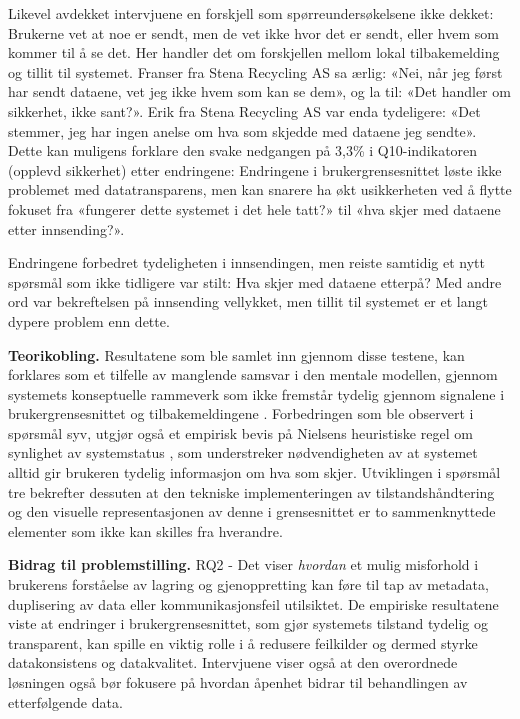 Likevel avdekket intervjuene en forskjell som spørreundersøkelsene ikke dekket: Brukerne vet at noe er sendt, men de vet ikke hvor det er sendt, eller hvem som kommer til å se det. Her handler det om forskjellen mellom lokal tilbakemelding og tillit til systemet. Franser fra Stena Recycling AS sa ærlig: «Nei, når jeg først har sendt dataene, vet jeg ikke hvem som kan se dem», og la til: «Det handler om sikkerhet, ikke sant?». Erik fra Stena Recycling AS var enda tydeligere: «Det stemmer, jeg har ingen anelse om hva som skjedde med dataene jeg sendte». Dette kan muligens forklare den svake nedgangen på 3,3\% i Q10-indikatoren (opplevd sikkerhet) etter endringene: Endringene i brukergrensesnittet løste ikke problemet med datatransparens, men kan snarere ha økt usikkerheten ved å flytte fokuset fra «fungerer dette systemet i det hele tatt?» til «hva skjer med dataene etter innsending?».

Endringene forbedret tydeligheten i innsendingen, men reiste samtidig et nytt spørsmål som ikke tidligere var stilt: Hva skjer med dataene etterpå? Med andre ord var bekreftelsen på innsending vellykket, men tillit til systemet er et langt dypere problem enn dette.


\textbf{Teorikobling.} Resultatene som ble samlet inn gjennom disse testene, kan forklares som et tilfelle av manglende samsvar i den mentale modellen, gjennom systemets konseptuelle rammeverk som ikke fremstår tydelig gjennom signalene i brukergrensesnittet og tilbakemeldingene \cite{nielsen1994, norman2013}. Forbedringen som ble observert i spørsmål syv, utgjør også et empirisk bevis på Nielsens heuristiske regel om synlighet av systemstatus \cite{nielsen1994}, som understreker nødvendigheten av at systemet alltid gir brukeren tydelig informasjon om hva som skjer. Utviklingen i spørsmål tre bekrefter dessuten at den tekniske implementeringen av tilstandshåndtering og den visuelle representasjonen av denne i grensesnittet er to sammenknyttede elementer som ikke kan skilles fra hverandre.

\textbf{Bidrag til problemstilling.} RQ2 - Det viser \emph{hvordan} et mulig misforhold i brukerens forståelse av lagring og gjenoppretting kan føre til tap av metadata, duplisering av data eller kommunikasjonsfeil utilsiktet. De empiriske resultatene viste at endringer i brukergrensesnittet, som gjør systemets tilstand tydelig og transparent, kan spille en viktig rolle i å redusere feilkilder og dermed styrke datakonsistens og datakvalitet. Intervjuene viser også at den overordnede løsningen også bør fokusere på hvordan åpenhet bidrar til behandlingen av etterfølgende data.

